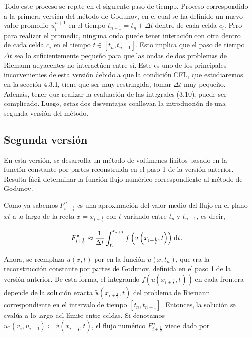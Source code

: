 Todo este proceso se repite en el siguiente paso de tiempo.
Proceso correspondido a la primera versión del método de Godunov, en
el cual se ha deﬁnido un nuevo valor promedio $u^{n+1}_{i}$ en el tiempo
$t_{n+1}=t_{n}+\Delta t$ dentro de cada celda $c_{i}$.
Pero para realizar el promedio, ninguna onda puede tener interación
con otra dentro de cada celda $c_{i}$ en el tiempo $t\in\left[t_{n},t_{n+1}\right]$.
Esto implica que el paso de tiempo $\Delta t$ sea lo suﬁcientemente pequeño para
que las ondas de dos problemas de Riemann adyacentes no interactúen entre sí.
Este es uno de los principales inconvenientes de esta versión debido a que
la condición CFL, que estudiaremos en la sección 4.3.1, tiene que ser muy restringida,
tomar $\Delta t$ muy pequeño.
Además, tener que realizar la evaluación de las integrales (3.10), puede ser complicado.
Luego, estas dos desventajas conllevan la introducción de una segunda versión del método.

\subsection{Segunda versión}

En esta versión, se desarrolla un método de volúmenes ﬁnitos basado
en la función constante por partes reconstruida en el paso 1 de la
versión anterior.
Resulta fácil determinar la función ﬂujo numérico correspondiente al
método de Godunov.

Como ya sabemos $F^{n}_{i+\frac{1}{2}}$ es una aproximación del valor medio del ﬂujo
en el plano $xt$ a lo largo de la recta $x=x_{i+\frac{1}{2}}$ con $t$
variando entre $t_{n}$ y $t_{n+1}$, es decir,

\begin{equation*}
    F^{n}_{i+\frac{1}{2}}\approx
    \frac{1}{\Delta t}
    \int_{t_{n}}^{t_{n+1}}
    f\left(u\left(x_{i+\frac{1}{2}},t\right)\right)
    \dl t.
\end{equation*}

Ahora, se reemplaza $u\left(x,t\right)$ por en la función $\widetilde{u}\left(x,t_{n}\right)$,
que era la reconstrucción constante por partes de Godunov, definida en el paso 1 de la versión anterior.
De esta forma, el integrando $f\left(u\left(x_{i+\frac{1}{2}},t\right)\right)$ en cada frontera depende de la
solución exacta $\widetilde{u}\left(x_{i+\frac{1}{2}},t\right)$ del problema de Riemann correspondiente en el
intervalo de tiempo $\left[t_{n},t_{n+1}\right]$.
Entonces, la solución se evalúa a lo largo del límite entre celdas.
Si denotamos
\begin{math}
    u^{\downarrow}
    \left(u_{i},u_{i+1}\right)\coloneqq
    \widetilde{u}
    \left(x_{i+\frac{1}{2}},t\right)
\end{math},
el flujo numérico $F^{n}_{i+\frac{1}{2}}$ viene dado por

